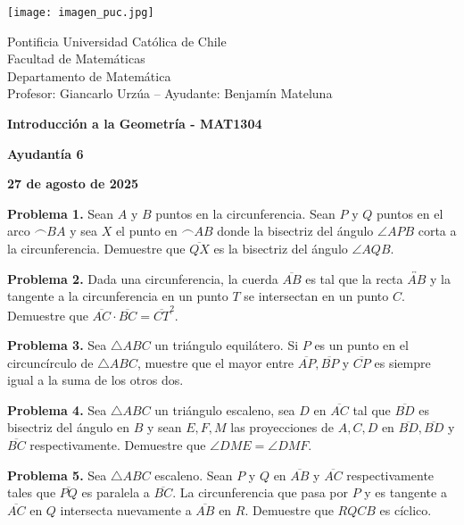\documentclass{article}
\begin{document}
\begin{minipage}{2.5cm}
    \texttt{[image: imagen\_puc.jpg]}
\end{minipage}
\begin{minipage}{14cm}
    {\sc Pontificia Universidad Católica de Chile\\
    Facultad de Matemáticas\\
    Departamento de Matemática\\
    Profesor: Giancarlo Urzúa -- Ayudante: Benjamín Mateluna}
\end{minipage}
\vspace{1ex}

{\centerline{\bf Introducción a la Geometría - MAT1304}
\centerline{\bf Ayudantía 6}}
\centerline{\bf 27 de agosto de 2025}

\vspace{1cm}
\noindent\textbf{Problema 1.} Sean $A$ y $B$ puntos en la circunferencia. Sean $P$ y $Q$ puntos en
el arco $\frown{BA}$ y sea $X$ el punto en $\frown{AB}$ donde la bisectriz del ángulo $\angle APB$
corta a la circunferencia. Demuestre que $\overline{QX}$ es la bisectriz del ángulo $\angle AQB$.

\vspace{2mm}
\noindent\textbf{Problema 2.} Dada una circunferencia, la cuerda $\overline{AB}$ es tal que la
recta $\overleftrightarrow{AB}$ y la tangente a la circunferencia en un punto $T$ se intersectan
en un punto $C$. Demuestre que $\overline{AC}\cdot\overline{BC}=\overline{CT}^{2}$.

\vspace{2mm}
\noindent\textbf{Problema 3.} Sea $\triangle ABC$ un triángulo equilátero. Si $P$ es un punto en
el circuncírculo de $\triangle ABC$, muestre que el mayor entre $\overline{AP},\overline{BP}$ y
$\overline{CP}$ es siempre igual a la suma de los otros dos.

\vspace{2mm}
\noindent\textbf{Problema 4.} Sea $\triangle ABC$ un triángulo escaleno, sea $D$ en 
$\overline{AC}$ tal que $\overline{BD}$ es bisectriz del ángulo en $B$ y sean $E,F,M$ las 
proyecciones de $A,C,D$ en $\overline{BD},\overline{BD}$ y $\overline{BC}$ respectivamente. 
Demuestre que $\angle DME=\angle DMF$.

\vspace{2mm}
\noindent\textbf{Problema 5.} Sea $\triangle ABC$ escaleno. Sean $P$ y $Q$ en $\overline{AB}$ y
$\overline{AC}$ respectivamente tales que $\overline{PQ}$ es paralela a $\overline{BC}$. La 
circunferencia que pasa por $P$ y es tangente a $\overline{AC}$ en $Q$ intersecta nuevamente a 
$\overline{AB}$ en $R$. Demuestre que $RQCB$ es cíclico.

\end{document}
